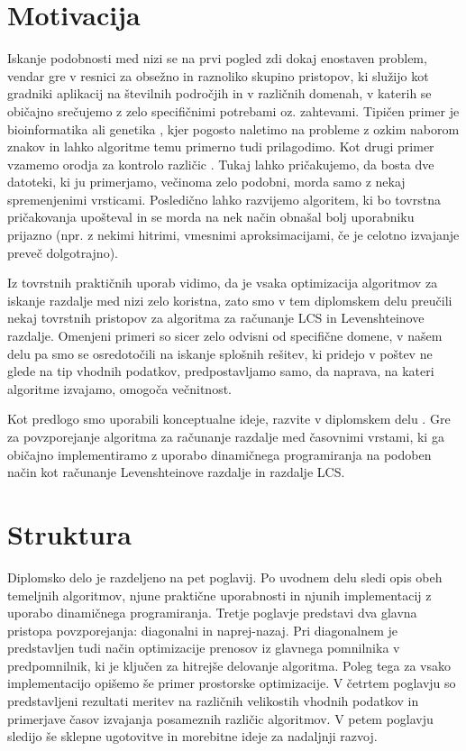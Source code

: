 \documentclass[a4paper,12pt,openright]{book}
\begin{document}
\section{Motivacija}

Iskanje podobnosti med nizi se na prvi pogled zdi dokaj enostaven problem, vendar gre v resnici za obsežno in raznoliko skupino pristopov, ki služijo kot gradniki aplikacij na številnih področjih in v različnih domenah, v katerih se običajno srečujemo z zelo specifičnimi potrebami oz. zahtevami. Tipičen primer je bioinformatika ali genetika \cite{LCSpracticalUse}, kjer pogosto naletimo na probleme z ozkim naborom znakov in lahko algoritme temu primerno tudi prilagodimo. Kot drugi primer vzamemo orodja za kontrolo različic \cite{levenshteinMotivation}. Tukaj lahko pričakujemo, da bosta dve datoteki, ki ju primerjamo, večinoma zelo podobni, morda samo z nekaj spremenjenimi vrsticami. Posledično lahko razvijemo algoritem, ki bo tovrstna pričakovanja upošteval in se morda na nek način obnašal bolj uporabniku prijazno (npr. z nekimi hitrimi, vmesnimi aproksimacijami, če je celotno izvajanje preveč dolgotrajno). 

Iz tovrstnih praktičnih uporab vidimo, da je vsaka optimizacija algoritmov za iskanje razdalje med nizi zelo koristna, zato smo v tem diplomskem delu preučili nekaj tovrstnih pristopov za algoritma za računanje LCS in Levenshteinove razdalje. Omenjeni primeri so sicer zelo odvisni od specifične domene, v našem delu pa smo se osredotočili na iskanje splošnih rešitev, ki pridejo v poštev ne glede na tip vhodnih podatkov, predpostavljamo samo, da naprava, na kateri algoritme izvajamo, omogoča večnitnost. 

Kot predlogo smo uporabili konceptualne ideje, razvite v diplomskem delu \cite{diplomaPremk}. Gre za povzporejanje algoritma za računanje razdalje med časovnimi vrstami, ki ga običajno implementiramo z uporabo dinamičnega programiranja na podoben način kot računanje Levenshteinove razdalje in razdalje LCS. 

\section{Struktura}

Diplomsko delo je razdeljeno na pet poglavij. Po uvodnem delu sledi opis obeh temeljnih algoritmov, njune praktične uporabnosti in njunih implementacij z uporabo dinamičnega programiranja. Tretje poglavje predstavi dva glavna pristopa povzporejanja: diagonalni in naprej-nazaj. Pri diagonalnem je predstavljen tudi način optimizacije prenosov iz glavnega pomnilnika v predpomnilnik, ki je ključen za hitrejše delovanje algoritma. Poleg tega za vsako implementacijo opišemo še primer prostorske optimizacije. V četrtem poglavju so predstavljeni rezultati meritev na različnih velikostih vhodnih podatkov in primerjave časov izvajanja posameznih različic algoritmov. V petem poglavju sledijo še sklepne ugotovitve in morebitne ideje za nadaljnji razvoj. 
\end{document}
